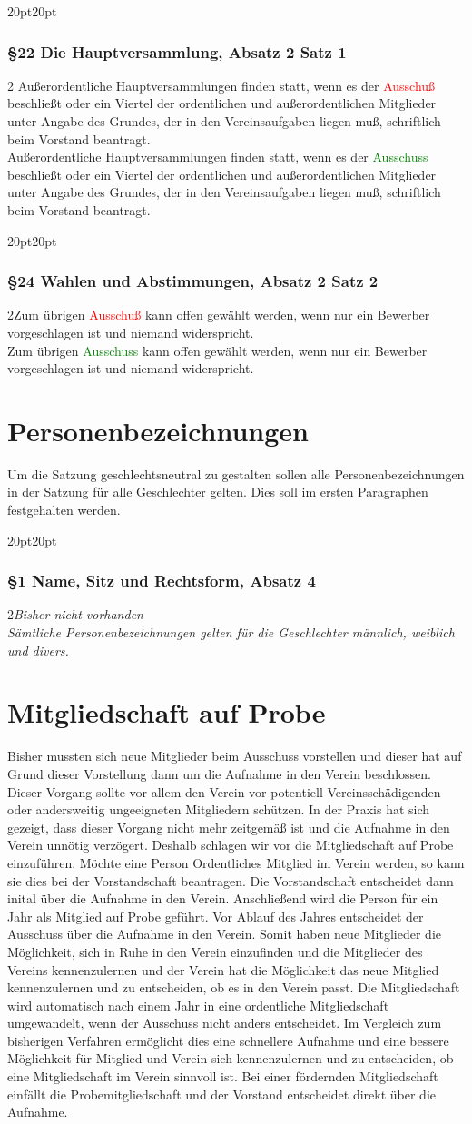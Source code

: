 \documentclass[10pt,a4paper,parskip=half]{scrartcl}
\newcommand{\new}[1]{\textcolor{Green}{#1}}
\newcommand{\old}[1]{\textcolor{Red}{#1}}
\newcommand{\change}[1]{
  \begin{adjustwidth}{20pt}{20pt}
    #1
  \end{adjustwidth}
}
\newcommand{\compare}[3]{\change{\subsubsection*{#1}\begin{multicols}{2}#2\columnbreak\\#3\end{multicols}}}
\begin{document}
\clearpage
\compare{§22 Die Hauptversammlung, Absatz 2 Satz 1}
{
  Außerordentliche Hauptversammlungen finden statt,
  wenn es der \old{Ausschuß} beschließt oder ein Viertel der ordentlichen und außerordentlichen Mitglieder unter Angabe des Grundes,
  der in den Vereinsaufgaben liegen muß,
  schriftlich beim Vorstand beantragt.
}
{
  Außerordentliche Hauptversammlungen finden statt,
  wenn es der \new{Ausschuss} beschließt oder ein Viertel der ordentlichen und außerordentlichen Mitglieder unter Angabe des Grundes,
  der in den Vereinsaufgaben liegen muß,
  schriftlich beim Vorstand beantragt.
}

\compare{§24 Wahlen und Abstimmungen, Absatz 2 Satz 2}
{Zum übrigen \old{Ausschuß} kann offen gewählt werden, wenn nur ein Bewerber vorgeschlagen ist und niemand widerspricht.}
{Zum übrigen \new{Ausschuss} kann offen gewählt werden, wenn nur ein Bewerber vorgeschlagen ist und niemand widerspricht.}
\clearpage
\section{Personenbezeichnungen}
Um die Satzung geschlechtsneutral zu gestalten sollen alle Personenbezeichnungen in der Satzung für alle Geschlechter gelten. Dies soll im ersten Paragraphen festgehalten werden.

\compare{§1 Name, Sitz und Rechtsform, Absatz 4}{\em Bisher nicht vorhanden \em}{Sämtliche Personenbezeichnungen gelten für die Geschlechter männlich, weiblich und divers.}

\clearpage
\section{Mitgliedschaft auf Probe}
Bisher mussten sich neue Mitglieder beim Ausschuss vorstellen und dieser hat auf Grund dieser Vorstellung dann um die Aufnahme in den Verein beschlossen. Dieser Vorgang sollte vor allem den Verein vor potentiell Vereinsschädigenden oder andersweitig ungeeigneten Mitgliedern schützen. In der Praxis hat sich gezeigt, dass dieser Vorgang nicht mehr zeitgemäß ist und die Aufnahme in den Verein unnötig verzögert. Deshalb schlagen wir vor die Mitgliedschaft auf Probe einzuführen. Möchte eine Person Ordentliches Mitglied im Verein werden, so kann sie dies bei der Vorstandschaft beantragen. Die Vorstandschaft entscheidet dann inital über die Aufnahme in den Verein. Anschließend wird die Person für ein Jahr als Mitglied auf Probe geführt. Vor Ablauf des Jahres entscheidet der Ausschuss über die Aufnahme in den Verein. Somit haben neue Mitglieder die Möglichkeit, sich in Ruhe in den Verein einzufinden und die Mitglieder des Vereins kennenzulernen und der Verein hat die Möglichkeit das neue Mitglied kennenzulernen und zu entscheiden, ob es in den Verein passt. Die Mitgliedschaft wird automatisch nach einem Jahr in eine ordentliche Mitgliedschaft umgewandelt, wenn der Ausschuss nicht anders entscheidet. Im Vergleich zum bisherigen Verfahren ermöglicht dies eine schnellere Aufnahme und eine bessere Möglichkeit für Mitglied und Verein sich kennenzulernen und zu entscheiden, ob eine Mitgliedschaft im Verein sinnvoll ist. Bei einer fördernden Mitgliedschaft einfällt die Probemitgliedschaft und der Vorstand entscheidet direkt über die Aufnahme.
\end{document}
